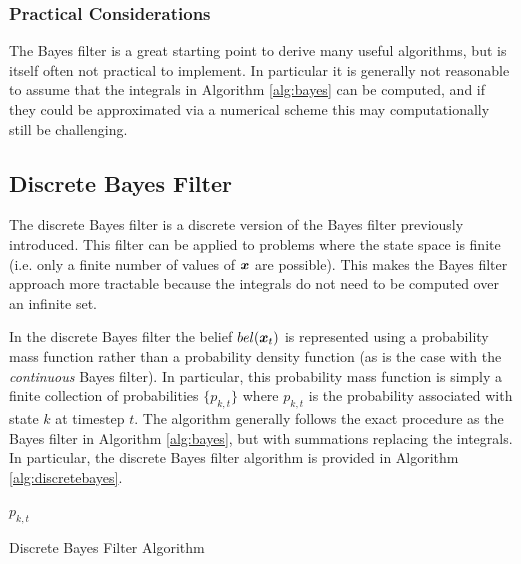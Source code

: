 \subsubsection{Practical Considerations}
The Bayes filter is a great starting point to derive many useful algorithms, but is itself often not practical to implement. In particular it is generally not reasonable to assume that the integrals in Algorithm \ref{alg:bayes} can be computed, and if they could be approximated via a numerical scheme this may computationally still be challenging.

\subsection{Discrete Bayes Filter}
The discrete Bayes filter is a discrete version of the Bayes filter previously introduced. This filter can be applied to problems where the state space is finite (i.e. only a finite number of values of $\bm{x}$ are possible). This makes the Bayes filter approach more tractable because the integrals do not need to be computed over an infinite set.

In the discrete Bayes filter the belief $bel(\bm{x}_{t})$ is represented using a probability mass function rather than a probability density function (as is the case with the \textit{continuous} Bayes filter). In particular, this probability mass function is simply a finite collection of probabilities $\{p_{k,t}\}$ where $p_{k,t}$ is the probability associated with state $k$ at timestep $t$. The algorithm generally follows the exact procedure as the Bayes filter in Algorithm \ref{alg:bayes}, but with summations replacing the integrals. In particular, the discrete Bayes filter algorithm is provided in Algorithm \ref{alg:discretebayes}.
\begin{algorithm}[ht]
 \Return $p_{k,t}$
 \caption{Discrete Bayes Filter Algorithm}
 \label{alg:discretebayes}
\end{algorithm}